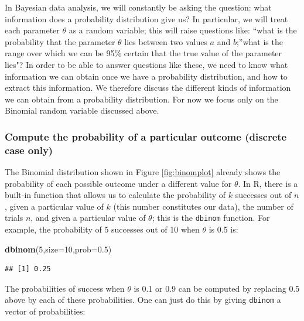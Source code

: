 \documentclass[12pt,]{krantz}
\newenvironment{Shaded}{\begin{snugshade}}{\end{snugshade}}
\newcommand{\DataTypeTok}[1]{\textcolor[rgb]{0.13,0.29,0.53}{#1}}
\newcommand{\DecValTok}[1]{\textcolor[rgb]{0.00,0.00,0.81}{#1}}
\newcommand{\FloatTok}[1]{\textcolor[rgb]{0.00,0.00,0.81}{#1}}
\newcommand{\KeywordTok}[1]{\textcolor[rgb]{0.13,0.29,0.53}{\textbf{#1}}}
\newcommand{\NormalTok}[1]{#1}
\theoremstyle{definition}
\theoremstyle{definition}
\theoremstyle{definition}
\theoremstyle{remark}
\begin{document}
In Bayesian data analysis, we will constantly be asking the question: what information does a probability distribution give us? In particular, we will treat each parameter \(\theta\) as a random variable; this will raise questions like: ``what is the probability that the parameter \(\theta\) lies between two values \(a\) and \(b\);''what is the range over which we can be 95\% certain that the true value of the parameter lies"? In order to be able to answer questions like these, we need to know what information we can obtain once we have a probability distribution, and how to extract this information. We therefore discuss the different kinds of information we can obtain from a probability distribution. For now we focus only on the Binomial random variable discussed above.

\hypertarget{compute-the-probability-of-a-particular-outcome-discrete-case-only}{%
\subsubsection{Compute the probability of a particular outcome (discrete case only)}\label{compute-the-probability-of-a-particular-outcome-discrete-case-only}}

The Binomial distribution shown in Figure \ref{fig:binomplot} already shows the probability of each possible outcome under a different value for \(\theta\). In R, there is a built-in function that allows us to calculate the probability of \(k\) successes out of \(n\), given a particular value of \(k\) (this number constitutes our data), the number of trials \(n\), and given a particular value of \(\theta\); this is the \texttt{dbinom} function. For example, the probability of 5 successes out of 10 when \(\theta\) is 0.5 is:

\begin{Shaded}
\begin{Highlighting}[]
\KeywordTok{dbinom}\NormalTok{(}\DecValTok{5}\NormalTok{,}\DataTypeTok{size=}\DecValTok{10}\NormalTok{,}\DataTypeTok{prob=}\FloatTok{0.5}\NormalTok{)}
\end{Highlighting}
\end{Shaded}

\begin{verbatim}
## [1] 0.25
\end{verbatim}

The probabilities of success when \(\theta\) is 0.1 or 0.9 can be computed by replacing 0.5 above by each of these probabilities. One can just do this by giving \texttt{dbinom} a vector of probabilities:
\end{document}
